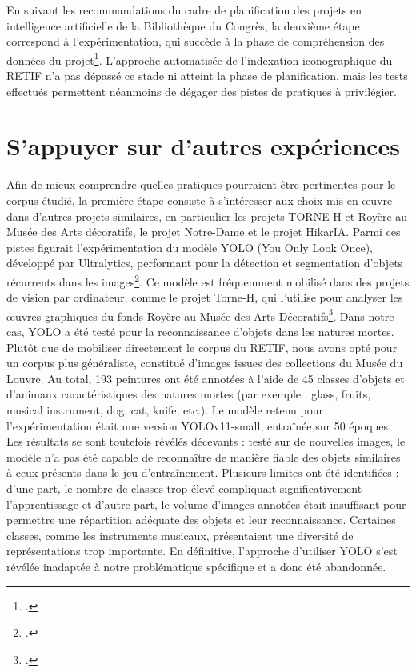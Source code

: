 En suivant les recommandations du cadre de planification des projets en intelligence artificielle de la Bibliothèque du Congrès, la deuxième étape correspond à l’expérimentation, qui succède à la phase de compréhension des données du projet\footcite{libraryofcongressPlanificationProjetIA2025}. L’approche automatisée de l’indexation iconographique du RETIF n’a pas dépassé ce stade ni atteint la phase de planification, mais les tests effectués permettent néanmoins de dégager des pistes de pratiques à privilégier.

\section{S’appuyer sur d’autres expériences}

Afin de mieux comprendre quelles pratiques pourraient être pertinentes pour le corpus étudié, la première étape consiste à s’intéresser aux choix mis en œuvre dans d’autres projets similaires, en particulier les projets TORNE-H et Royère au Musée des Arts décoratifs, le projet Notre-Dame et le projet HikarIA. 
Parmi ces pistes figurait l’expérimentation du modèle YOLO (You Only Look Once), développé par Ultralytics, performant pour la détection et segmentation d’objets récurrents dans les images\footcite{ultralyticsYOLOv8YOLOv112025}. Ce modèle est fréquemment mobilisé dans des projets de vision par ordinateur, comme le projet Torne-H, qui l’utilise pour analyser les œuvres graphiques du fonds Royère au Musée des Arts Décoratifs\footcite{bermesRepenserCollectionsPatrimoniales2025}. Dans notre cas, YOLO a été testé pour la reconnaissance d’objets dans les natures mortes. Plutôt que de mobiliser directement le corpus du RETIF, nous avons opté pour un corpus plus généraliste, constitué d’images issues des collections du Musée du Louvre. Au total, 193 peintures ont été annotées à l’aide de 45 classes d’objets et d’animaux caractéristiques des natures mortes (par exemple : glass, fruits, musical instrument, dog, cat, knife, etc.). Le modèle retenu pour l’expérimentation était une version YOLOv11-small, entraînée sur 50 époques. Les résultats se sont toutefois révélés décevants : testé sur de nouvelles images, le modèle n’a pas été capable de reconnaître de manière fiable des objets similaires à ceux présents dans le jeu d’entraînement. Plusieurs limites ont été identifiées : d’une part, le nombre de classes trop élevé compliquait significativement l’apprentissage et d’autre part, le volume d’images annotées était insuffisant pour permettre une répartition adéquate des objets et leur reconnaissance. Certaines classes, comme les instruments musicaux, présentaient une diversité de représentations trop importante. En définitive, l’approche d’utiliser YOLO s’est révélée inadaptée à notre problématique spécifique et a donc été abandonnée.
